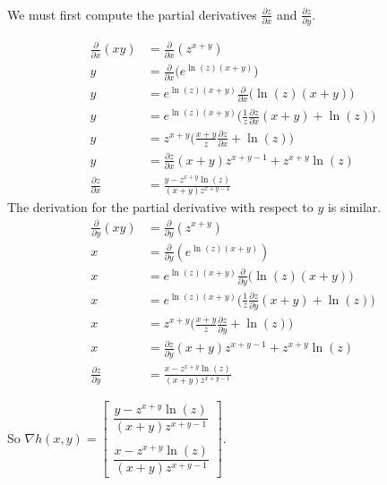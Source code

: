 \item {}\\ 
We must first compute the partial derivatives $\frac{\partial z}{\partial x}$ and $\frac{\partial z}{\partial y}$.

 \begin{align*}
  \frac{\partial}{\partial x}(xy) &= \frac{\partial}{\partial x}(z^{x+y}) \\
  y &= \frac{\partial}{\partial x}\Big(e^{\ln(z)(x+y)}\Big) \\
  y &= e^{\ln(z)(x+y)}\frac{\partial}{\partial x}\Big(\ln(z)(x+y)\Big) \\
  y &= e^{\ln(z)(x+y)}\Big(\frac{1}{z}\frac{\partial z}{\partial x}(x+y) + \ln(z)\Big) \\
  y &= z^{x+y}\Big(\frac{x+y}{z}\frac{\partial z}{\partial x} + \ln(z)\Big) \\
  y &= \frac{\partial z}{\partial x}(x+y)z^{x+y-1} + z^{x+y}\ln(z) \\
  \frac{\partial z}{\partial x} &= \frac{y - z^{x+y}\ln(z)}{(x+y)z^{x+y-1}}
 \end{align*}
The derivation for the partial derivative with respect to $y$ is similar.
 \begin{align*}
  \frac{\partial}{\partial y}(xy) &= \frac{\partial}{\partial y}(z^{x+y}) \\
  x &= \frac{\partial}{\partial y}(e^{\ln(z)(x+y)}) \\
  x &= e^{\ln(z)(x+y)}\frac{\partial}{\partial y}\big(\ln(z)(x+y)\big) \\
  x &= e^{\ln(z)(x+y)}\Big(\frac{1}{z}\frac{\partial z}{\partial y}(x+y) + \ln(z)\Big) \\
  x &= z^{x+y}\Big(\frac{x+y}{z}\frac{\partial z}{\partial y} + \ln(z)\Big) \\
  x &= \frac{\partial z}{\partial y}(x+y)z^{x+y-1} + z^{x+y}\ln(z) \\
  \frac{\partial z}{\partial y} &= \frac{x - z^{x+y}\ln(z)}{(x+y)z^{x+y-1}}
 \end{align*}

So $\nabla h(x,y) = \begin{bmatrix}
                \dfrac{y - z^{x+y}\ln(z)}{(x+y)z^{x+y-1}} \\\\
                \dfrac{x - z^{x+y}\ln(z)}{(x+y)z^{x+y-1}}
               \end{bmatrix}$.

